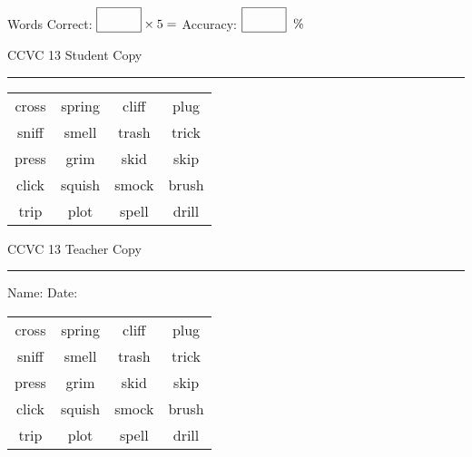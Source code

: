 \documentclass{memoir}
\begin{document}
\small

Words Correct: $\fbox{\phantom{\huge 100}} \times 5 = $ Accuracy: $\fbox{\phantom{\huge 100}}\;\; \%$ 

\vfill

\newpage


\footnotesize \noindent
CCVC 13 \hfill Student Copy
\smallskip
\hrule

\Large

\setlength{\tabcolsep}{14pt}
\def\arraystretch{3}

{\selectfont


\begin{vplace}[0.5]
\begin{center}
\begin{tabular}{cccc}
cross & spring & cliff            & plug \\
sniff & smell & trash & trick \\
press       & grim       & skid & skip \\
click             & squish & smock & brush \\
trip & plot & spell & drill \\
\end{tabular}
\end{center}
\end{vplace}

}

\newpage

\footnotesize \noindent
CCVC 13 \hfill Teacher Copy
\smallskip
\hrule

\small

\vfill

\noindent
Name: \underline{\hspace{1.75in}} \hfill Date: \underline{\hspace{1in}}

\Large

{\selectfont


\begin{vplace}[0.5]
\begin{center}
\begin{tabular}{cccc}
cross & spring & cliff            & plug \\
sniff & smell & trash & trick \\
press       & grim       & skid & skip \\
click             & squish & smock & brush \\
trip & plot & spell & drill \\
\end{tabular}
\end{center}
\end{vplace}



}
\end{document}
